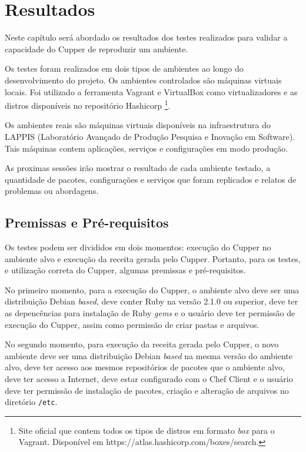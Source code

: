 \newpage\null\thispagestyle{empty}\newpage
\chapter{Resultados}
\label{chap:result}

Neste capítulo será abordado os resultados dos testes realizados
para validar a capacidade do Cupper de reproduzir um ambiente.

Os testes foram realizados em dois tipos de ambientes ao longo do
desenvolvimento do projeto. Os ambientes controlados são máquinas
virtuais locais. Foi utilizado a ferramenta Vagrant e VirtualBox
como virtualizadores e as distros disponíveis no repositório Hashicorp
\footnote{Site oficial que contem todos os tipos de distros em formato \textit{box} para o Vagrant. Disponível em https://atlas.hashicorp.com/boxes/search.}.

Os ambientes reais são máquinas virtuais disponíveis na infraestrutura
do LAPPIS (Laboratório Avançado de Produção Pesquisa e Inovação em Software).
Tais máquinas contem aplicações, serviços e configurações em modo produção.

As proximas sessões irão mostrar o resultado de cada ambiente testado,
a quantidade de pacotes, configurações e serviços que foram replicados
e relatos de problemas ou abordagens.

\section{Premissas e Pré-requisitos}

Os testes podem ser divididos em dois momentos: execução do Cupper no
ambiente alvo e execução da receita gerada pelo Cupper. Portanto,
para os testes, e utilização correta do Cupper, algumas premissas
e pré-requisitos.

No primeiro momento, para a execução do Cupper, o ambiente alvo deve
ser uma distribuição Debian \textit{based}, deve conter Ruby na versão
2.1.0 ou superior, deve ter as depencências para instalação
de Ruby \textit{gems} e o usuário deve ter permissão de execução do Cupper, assim como
permissão de criar pastas e arquivos.

No segundo momento, para execução da receita gerada pelo Cupper, o novo
ambiente deve ser uma distribuição Debian \textit{based} na mesma versão do ambiente
alvo, deve ter acesso aos mesmos repositórios de pacotes que
o ambiente alvo, deve ter acesso a Internet, deve estar configurado com o Chef Client e
o usuário deve ter permissão de instalação de pacotes, criação e alteração de arquivos no
diretório \texttt{/etc}.

